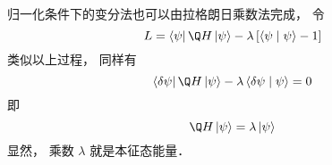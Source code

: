 归一化条件下的变分法也可以由拉格朗日乘数法完成， 令
 \begin{equation}
L = \left\langle \psi  \right|\Q H\left| \psi  \right\rangle  - \lambda \left[ {\left\langle {\psi }
 \mathrel{\left | {\vphantom {\psi  \psi }}
 \right. \kern-\nulldelimiterspace}
 {\psi } \right\rangle  - 1} \right]
\end{equation}
类似以上过程， 同样有
 \begin{equation}
\left\langle {\delta \psi } \right|\Q H\left| \psi  \right\rangle  - \lambda \left\langle {{\delta \psi }}
 \mathrel{\left | {\vphantom {{\delta \psi } \psi }}
 \right. \kern-\nulldelimiterspace}
 {\psi } \right\rangle  = 0
\end{equation}
即
 \begin{equation}
\Q H\left| \psi  \right\rangle  = \lambda \left| \psi  \right\rangle 
\end{equation}
显然， 乘数 $\lambda $ 就是本征态能量．
